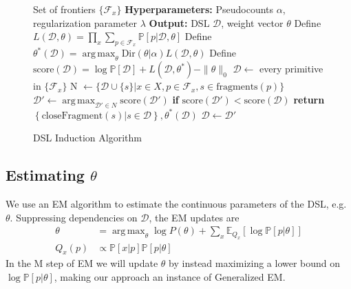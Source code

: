 \documentclass{article}
\DeclareMathOperator*{\argmax}{arg\,max} %
\newcommand{\expect}{\mathds{E}} %
\newcommand{\probability}{\mathds{P}} %
\begin{document}
\begin{figure}[H]
  \centering
  \begin{minipage}{\textwidth}    
    \begin{algorithm}[H]
    \setcounter{algorithm}{2} %
       \caption{DSL Induction Algorithm}
       \label{grammarInductionAlgorithm}
       \begin{algorithmic}
          Set of frontiers $\{\mathcal{F}_x\}$
         \STATE \textbf{Hyperparameters:} Pseudocounts $\alpha$, regularization parameter $\lambda$
         \STATE \textbf{Output:} DSL $\mathcal{D}$, weight vector $\theta$
         \STATE Define $L(\mathcal{D},\theta) =  \prod_x \sum_{p\in \mathcal{F}_x} \probability[p|\mathcal{D},\theta]$
         \STATE Define $\theta^*(\mathcal{D}) = \argmax_\theta \text{Dir}(\theta|\alpha) L(\mathcal{D},\theta)$
         \STATE Define $\text{score}(\mathcal{D}) = \log \probability[\mathcal{D}] + L(\mathcal{D},\theta^*) - \|\theta\|_0$
         \STATE $\mathcal{D}\gets$ every primitive in $\{\mathcal{F}_x\}$
         \STATE N $\gets \{\mathcal{D}\cup \{s\} | x\in X, p\in \mathcal{F}_x, s\in \text{fragments}(p)\}$
         \STATE $\mathcal{D}'\gets \argmax_{\mathcal{D}'\in N}\text{score}(\mathcal{D}') $
         \STATE \textbf{if }$\text{score}(\mathcal{D}') < \text{score}(\mathcal{D})$\textbf{ return }$\left\{\text{closeFragment}(s)|s\in \mathcal{D} \right\},\theta^*(\mathcal{D})$
         \STATE $\mathcal{D}\gets\mathcal{D}'$
         \ENDWHILE
       \end{algorithmic}
    \end{algorithm}
  \end{minipage}
\end{figure}

\subsection{Estimating $\theta$}

We use an EM algorithm to estimate the continuous parameters of the DSL, e.g. $\theta$.
Suppressing dependencies on $\mathcal{D}$, the EM updates are
\begin{align}
\label{maximizeStep}  \theta& = \argmax_\theta \log P(\theta) + \sum_x \expect_{Q_x}\left[\log \probability\left[p|\theta \right] \right]\\
  Q_x(p)&\propto \probability[x|p]\probability[p|\theta]
  \end{align}
In the M step of EM we will update $\theta$ by instead maximizing a lower bound on $\log \probability[p|\theta]$,
making our approach an instance of Generalized EM.
\end{document}
